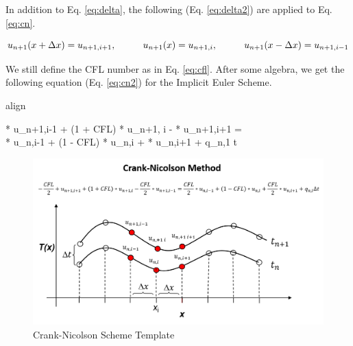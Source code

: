 \documentclass[10pt, letter, showtrims]{extarticle}
\newcommand{\boxedeq}[2]{\begin{empheq}[box={\fboxsep=6pt\fbox}]{align}\label{#1}#2\end{empheq}}
\begin{document}
%		
		
		\noindent
		In addition to Eq. \ref{eq:delta}, the following (Eq. \ref{eq:delta2}) are applied to Eq. \ref{eq:cn}.
		
		\begin{equation}
		\label{eq:delta2}
			u_{n+1}(x + \Delta x) = u_{n+1,i+1}, \hphantom{xxxxx} u_{n+1}(x) = u_{n+1,i}, \hphantom{xxxxx} u_{n+1}(x - \Delta x) = u_{n+1,i-1}
		\end{equation}
		
		\noindent
		We still define the CFL number as in Eq. \ref{eq:cfl}. After some algebra, we get the following equation (Eq. \ref{eq:cn2}) for the Implicit Euler Scheme.
		
%		
%		
		
		\boxedeq{eq:cn2}{\begin{split} * u_{n+1,i-1} + (1 + CFL) * u_{n+1, i} - \frac{CFL}{2} * u_{n+1,i+1} = \\ \frac{CFL}{2} * u_{n,i-1} + (1 - CFL) * u_{n,i} + \frac{CFL}{2} * u_{n,i+1} + q_{n,1} \Delta t\end{split}}
		
		\FloatBarrier
		\begin{figure}[h]
			\centering
			\captionsetup{justification=centering}
			\includegraphics[width=0.65\linewidth]{"Figures/Crank_Nicolson_Method"}
			\caption{Crank-Nicolson Scheme Template}
			\label{fig:cn}
		\end{figure}
		\FloatBarrier
		
\end{document}
